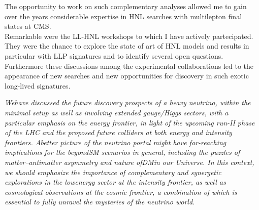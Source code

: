 The opportunity to work on such complementary analyses
allowed me to gain over the years considerable expertise in HNL
searches with multilepton final states at CMS.\\
Remarkable were the LL-HNL workshops to which I have actively
partecipated. They were the chance to explore the 
state of art of HNL models and results in particular with LLP
signatures and to identify several open questions. Furthermore these
discussions among the experimental collaborations led to the
appearance of new searches and new opportunities
for discovery in such exotic long-lived signatures.








\vspace {5cm}
















\emph{Wehave discussed the future 
discovery prospects of a heavy neutrino, within the minimal
setup as well as involving extended gauge/Higgs sectors, 
with a particular emphasis on the energy frontier, in
light of the upcoming run-II phase of the LHC and the 
proposed future colliders at both energy and intensity
frontiers. Abetter picture of the neutrino portal might
 have far-reaching implications for the beyondSM
scenarios in general, including the puzzles of matter–antimatter
 asymmetry and nature ofDMin our Universe.
In this context, we should emphasize the importance 
of complementary and synergetic explorations in the lowenergy
sector at the intensity frontier, as well as cosmological
 observations at the cosmic frontier, a combination
of which is essential to fully unravel the mysteries of the neutrino
world.}


